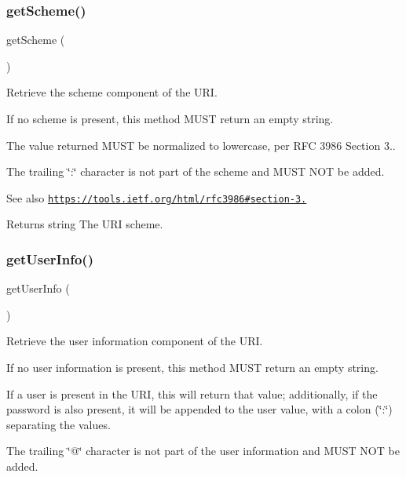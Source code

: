 \subsubsection{\texorpdfstring{get\+Scheme()}{getScheme()}}
{\footnotesize\ttfamily get\+Scheme (\begin{DoxyParamCaption}{ }\end{DoxyParamCaption})}

Retrieve the scheme component of the U\+RI.

If no scheme is present, this method M\+U\+ST return an empty string.

The value returned M\+U\+ST be normalized to lowercase, per R\+FC 3986 Section 3..

The trailing \char`\"{}\+:\char`\"{} character is not part of the scheme and M\+U\+ST N\+OT be added.

\begin{DoxySeeAlso}{See also}
\href{https://tools.ietf.org/html/rfc3986#section-3.1}{\tt https\+://tools.\+ietf.\+org/html/rfc3986\#section-\/3.} 
\end{DoxySeeAlso}
\begin{DoxyReturn}{Returns}
string The U\+RI scheme. 
\end{DoxyReturn}
\mbox{\label{class_pes_1_1_http_1_1_uri_a7e7999c3a04f08ffcc5e237fd28a6bc7}} 
\subsubsection{\texorpdfstring{get\+User\+Info()}{getUserInfo()}}
{\footnotesize\ttfamily get\+User\+Info (\begin{DoxyParamCaption}{ }\end{DoxyParamCaption})}

Retrieve the user information component of the U\+RI.

If no user information is present, this method M\+U\+ST return an empty string.

If a user is present in the U\+RI, this will return that value; additionally, if the password is also present, it will be appended to the user value, with a colon (\char`\"{}\+:\char`\"{}) separating the values.

The trailing \char`\"{}@\char`\"{} character is not part of the user information and M\+U\+ST N\+OT be added.

